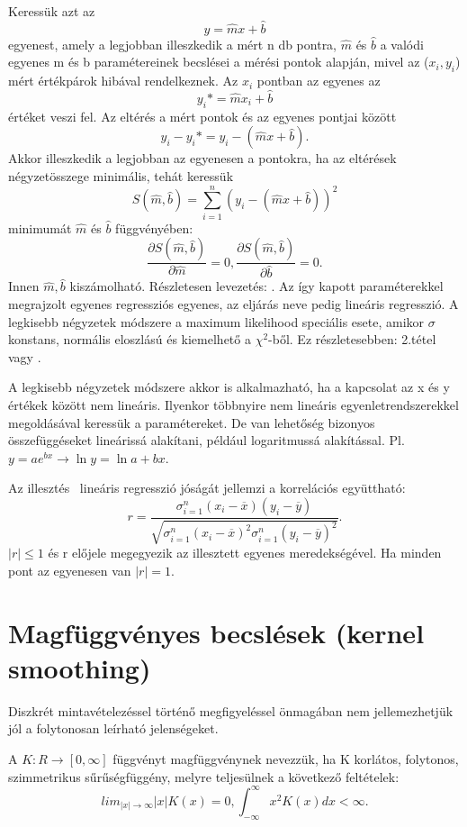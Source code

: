 \documentclass[12pt]{article}
\theoremstyle{plain}
\begin{document}
Keressük azt az $$ y = \hat{m}x+\hat{b} $$ egyenest, amely a legjobban illeszkedik a mért n db pontra, $\hat{m}$ és $\hat{b}$ a valódi egyenes m és b paramétereinek becslései a mérési pontok alapján, mivel az ($x_i, y_i$) mért értékpárok hibával rendelkeznek.  Az $x_i$ pontban az egyenes az $$ y_i* = \hat{m}x_i+\hat{b} $$ értéket veszi fel. Az eltérés a mért pontok és az egyenes pontjai között $$ y_i -y_i* = y_i - (\hat{m}x+\hat{b}). $$ Akkor illeszkedik a legjobban az egyenesen a pontokra, ha az eltérések négyzetösszege minimális, tehát keressük $$ S(\hat{m}, \hat{b}) = \sum_{i=1}^n (y_i - (\hat{m}x+\hat{b}) )^2 $$ minimumát $\hat{m}$ és $\hat{b}$ függvényében: $$ \frac{\partial S(\hat{m}, \hat{b})}{\partial \hat{m}} = 0, \frac{\partial S(\hat{m}, \hat{b})}{\partial \hat{b}} = 0. $$ Innen $\hat{m}, \hat{b}$ kiszámolható. Részletesen levezetés: \cite{klasszfiz}. Az így kapott paraméterekkel megrajzolt egyenes regressziós egyenes, az eljárás neve pedig lineáris regresszió.  A legkisebb négyzetek módszere a maximum likelihood speciális esete, amikor $\sigma $ konstans, normális eloszlású és kiemelhető a $\chi^2$-ből. Ez részletesebben: 2.tétel vagy \cite{dobos}. 

A legkisebb négyzetek módszere akkor is alkalmazható, ha a kapcsolat az x és y értékek között nem lineáris. Ilyenkor többnyire nem lineáris egyenletrendszerekkel megoldásával keressük a paramétereket. De van lehetőség bizonyos összefüggéseket lineárissá alakítani, például logaritmussá alakítással. Pl. $y = a e ^ {bx} \rightarrow \ln y = \ln a + bx$.  

Az illesztés \ lineáris regresszió jóságát jellemzi a  korrelációs együttható:
$$ r = \frac{\sigma_{i=1}^n (x_i - \overline{x}) (y_i - \overline{y})}{\sqrt{ \sigma_{i=1}^n (x_i - \overline{x})^2 \sigma_{i=1}^n (y_i - \overline{y})^2}}. 
$$ $|r| \leq 1 $ és r előjele megegyezik az illesztett egyenes meredekségével. Ha minden pont az egyenesen van $|r| = 1 $. 

\section{Magfüggvényes becslések (kernel smoothing)}
Diszkrét  mintavételezéssel történő megfigyeléssel önmagában nem jellemezhetjük jól a folytonosan leírható jelenségeket. 

A $K:R \rightarrow [0, \infty]$  függvényt magfüggvénynek nevezzük, ha K korlátos, folytonos, szimmetrikus sűrűségfüggény, melyre teljesülnek a következő feltételek: 
$$ lim_{|x| \rightarrow \infty} |x| K(x) = 0, \int_{-\infty}^{\infty}  x^2 K(x) dx < \infty. $$
\end{document}
